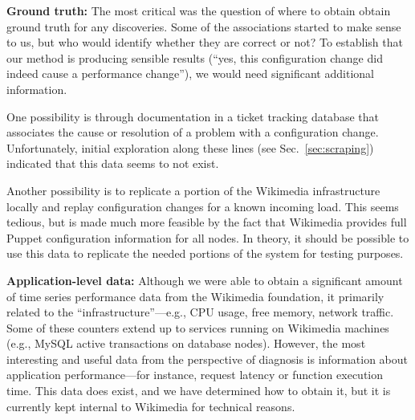 \documentclass[twocolumn]{article}
\begin{document}
\textbf{Ground truth:} The most critical was the question of where to obtain obtain ground truth for any discoveries. Some of the associations started to make sense to us, but who would identify whether they are correct or not? To establish that our method is producing sensible results (``yes, this configuration change did indeed cause a performance change''), we would need significant additional information. 

One possibility is through documentation in a ticket tracking database that associates the cause or resolution of a problem with a configuration change. Unfortunately, initial exploration along these lines (see Sec.~\ref{sec:scraping}) indicated that this data seems to not exist. 

Another possibility is to replicate a portion of the Wikimedia infrastructure locally and replay configuration changes for a known incoming load. This seems tedious, but is made much more feasible by the fact that Wikimedia provides full Puppet configuration information for all nodes. In theory, it should be possible to use this data to replicate the needed portions of the system for testing purposes.

\textbf{Application-level data:} Although we were able to obtain a significant amount of time series performance data from the Wikimedia foundation, it primarily related to the ``infrastructure''---e.g., CPU usage, free memory, network traffic. Some of these counters extend up to services running on Wikimedia machines (e.g., MySQL active transactions on database nodes). However, the most interesting and useful data from the perspective of diagnosis is information about application performance---for instance, request latency or function execution time. This data does exist, and we have determined how to obtain it, but it is currently kept internal to Wikimedia for technical reasons.
\end{document}

